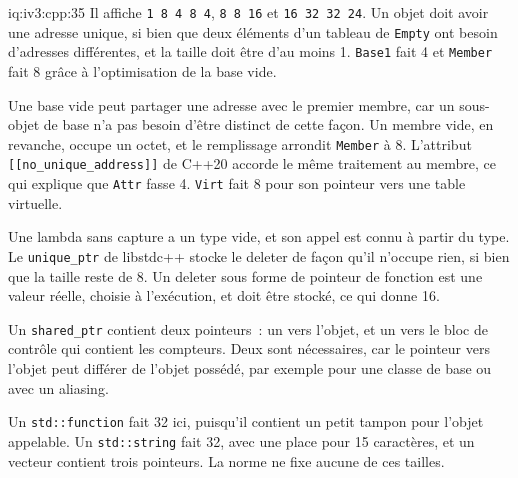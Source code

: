 \begin{solution}{iq:iv3:cpp:35}
Il affiche \texttt{1 8 4 8 4}, \texttt{8 8 16} et \texttt{16 32 32 24}. Un objet doit avoir une adresse unique, si bien que deux éléments d'un tableau de \texttt{Empty} ont besoin d'adresses différentes, et la taille doit être d'au moins 1. \texttt{Base1} fait 4 et \texttt{Member} fait 8 grâce à l'optimisation de la base vide.

Une base vide peut partager une adresse avec le premier membre, car un sous-objet de base n'a pas besoin d'être distinct de cette façon. Un membre vide, en revanche, occupe un octet, et le remplissage arrondit \texttt{Member} à 8. L'attribut \texttt{[[no\_unique\_address]]} de C++20 accorde le même traitement au membre, ce qui explique que \texttt{Attr} fasse 4. \texttt{Virt} fait 8 pour son pointeur vers une table virtuelle.

Une lambda sans capture a un type vide, et son appel est connu à partir du type. Le \texttt{unique\_ptr} de libstdc++ stocke le deleter de façon qu'il n'occupe rien, si bien que la taille reste de 8. Un deleter sous forme de pointeur de fonction est une valeur réelle, choisie à l'exécution, et doit être stocké, ce qui donne 16.

Un \texttt{shared\_ptr} contient deux pointeurs~: un vers l'objet, et un vers le bloc de contrôle qui contient les compteurs. Deux sont nécessaires, car le pointeur vers l'objet peut différer de l'objet possédé, par exemple pour une classe de base ou avec un aliasing.

Un \texttt{std::function} fait 32 ici, puisqu'il contient un petit tampon pour l'objet appelable. Un \texttt{std::string} fait 32, avec une place pour 15 caractères, et un vecteur contient trois pointeurs. La norme ne fixe aucune de ces tailles.

\end{solution}


